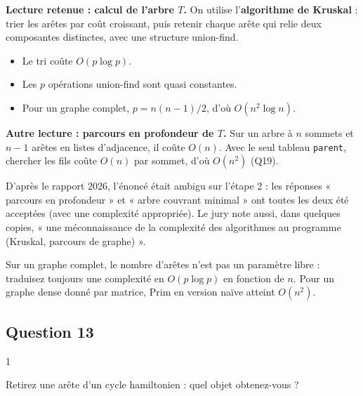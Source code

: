 \documentclass[11pt,a4paper]{article}
\providecommand{\tightlist}{\setlength{\itemsep}{0pt}\setlength{\parskip}{0pt}}
\begin{document}
\textbf{Lecture retenue : calcul de l'arbre \(T\).} On utilise l'\textbf{algorithme de Kruskal} : trier les arêtes par coût croissant, puis retenir chaque arête qui relie deux composantes distinctes, avec une structure union-find.

\begin{itemize}
\tightlist
\item
  Le tri coûte \(O(p\log p)\).
\item
  Les \(p\) opérations union-find sont quasi constantes.
\item
  Pour un graphe complet, \(p=n(n-1)/2\), d'où \textbf{\(O(n^2\log n)\)}.
\end{itemize}

\textbf{Autre lecture : parcours en profondeur de \(T\).} Sur un arbre à \(n\) sommets et \(n-1\) arêtes en listes d'adjacence, il coûte \textbf{\(O(n)\)}. Avec le seul tableau \texttt{parent}, chercher les fils coûte \(O(n)\) par sommet, d'où \(O(n^2)\) (Q19).

\begin{jury}

D'après le rapport 2026, l'énoncé était ambigu sur l'étape 2 : les réponses « parcours en profondeur » et « arbre couvrant minimal » ont toutes les deux été acceptées (avec une complexité appropriée). Le jury note aussi, dans quelques copies, « une méconnaissance de la complexité des algorithmes au programme (Kruskal, parcours de graphe) ».

\end{jury}

\begin{methode}

Sur un graphe complet, le nombre d'arêtes n'est pas un paramètre libre : traduisez toujours une complexité en \(O(p\log p)\) en fonction de \(n\). Pour un graphe dense donné par matrice, Prim en version naïve atteint \(O(n^2)\).

\end{methode}

\hypertarget{question-13}{%
\subsection{Question 13}\label{question-13}}

\begin{indication}{1}

Retirez une arête d'un cycle hamiltonien : quel objet obtenez-vous ?

\end{indication}
\end{document}
